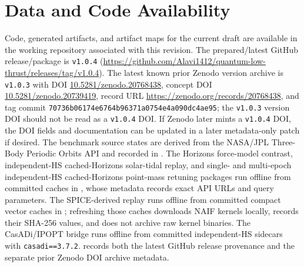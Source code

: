 \documentclass[preprint,12pt]{elsarticle}
\begin{document}
\section*{Data and Code Availability}
Code, generated artifacts, and artifact maps for the current draft are available in the working repository associated with this revision. The prepared/latest GitHub release/package is \texttt{v1.0.4} (\url{https://github.com/Alavi1412/quantum-low-thrust/releases/tag/v1.0.4}). The latest known prior Zenodo version archive is \texttt{v1.0.3} with DOI \href{https://doi.org/10.5281/zenodo.20768438}{10.5281/zenodo.20768438}, concept DOI \href{https://doi.org/10.5281/zenodo.20739419}{10.5281/zenodo.20739419}, record URL \url{https://zenodo.org/records/20768438}, and tag commit \texttt{70736b06174e6764b96371a0754e4a090dc4ae95}; the \texttt{v1.0.3} version DOI should not be read as a \texttt{v1.0.4} DOI. If Zenodo later mints a \texttt{v1.0.4} DOI, the DOI fields and documentation can be updated in a later metadata-only patch if desired. The benchmark source states are derived from the NASA/JPL Three-Body Periodic Orbits API and recorded in . The Horizons force-model contrast, independent-HS cached-Horizons solar-tidal replay, and single- and multi-epoch independent-HS cached-Horizons point-mass retuning packages run offline from committed caches in , whose metadata records exact API URLs and query parameters. The SPICE-derived replay runs offline from committed compact vector caches in ; refreshing those caches downloads NAIF kernels locally, records their SHA-256 values, and does not archive raw kernel binaries. The CasADi/IPOPT bridge runs offline from committed independent-HS sidecars with \texttt{casadi==3.7.2}.  records both the latest GitHub release provenance and the separate prior Zenodo DOI archive metadata.



\end{document}
